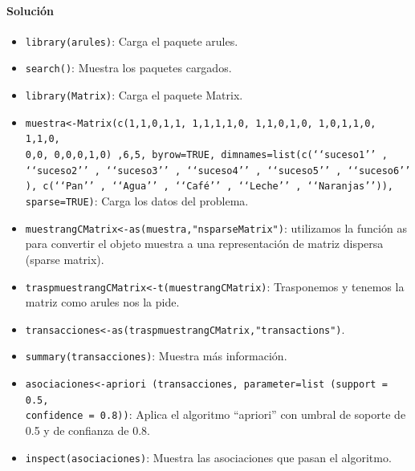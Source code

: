 \documentclass[a4paper, 12pt]{article}
\begin{document}
	\paragraph{Solución}
	\begin{itemize}
		\item \texttt{library(arules)}: Carga el paquete arules.
		\item \texttt{search()}: Muestra los paquetes cargados.
		\item \texttt{library(Matrix)}: Carga el paquete Matrix.
		\item \texttt{muestra<-Matrix(c(1,1,0,1,1, 1,1,1,1,0, 1,1,0,1,0, 1,0,1,1,0, 1,1,0,\\0,0, 0,0,0,1,0) ,6,5, byrow=TRUE, dimnames=list(c(‘‘suceso1’’ , ‘‘suceso2’’ , ‘‘suceso3’’ , ‘‘suceso4’’ , ‘‘suceso5’’ , ‘‘suceso6’’ ), c(‘‘Pan’’ , ‘‘Agua’’ , ‘‘Café’’ , ‘‘Leche’’ , ‘‘Naranjas’’)), sparse=TRUE)}: Carga los datos del problema.
		\item \texttt{muestrangCMatrix<-as(muestra,"nsparseMatrix")}: utilizamos la función as para convertir el objeto muestra a una representación de matriz dispersa (sparse matrix).
		\item \texttt{traspmuestrangCMatrix<-t(muestrangCMatrix)}: Trasponemos y tenemos la matriz como arules nos la pide.
		\item \texttt{transacciones<-as(traspmuestrangCMatrix,"transactions")}.
		\item \texttt{summary(transacciones)}: Muestra más información.
		\item \texttt{asociaciones<-apriori (transacciones, parameter=list (support = 0.5, \\confidence = 0.8))}: Aplica el algoritmo ``apriori'' con umbral de soporte de 0.5 y de confianza de 0.8.
		\item \texttt{inspect(asociaciones)}: Muestra las asociaciones que pasan el algoritmo.
	\end{itemize}
\end{document}
